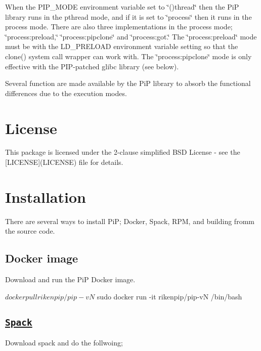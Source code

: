 When the {\ttfamily P\-I\-P\-\_\-\-M\-O\-D\-E} environment variable set to \char`\"{}()thread\char`\"{} then the Pi\-P library runs in the pthread mode, and if it is set to \char`\"{}process\char`\"{} then it runs in the process mode. There are also three implementations in the process mode; \char`\"{}process\-:preload,\char`\"{} \char`\"{}process\-:pipclone\char`\"{} and \char`\"{}process\-:got.\char`\"{} The \char`\"{}process\-:preload\char`\"{} mode must be with the L\-D\-\_\-\-P\-R\-E\-L\-O\-A\-D environment variable setting so that the clone() system call wrapper can work with. The \char`\"{}process\-:pipclone\char`\"{} mode is only effective with the P\-I\-P-\/patched glibc library (see below).

Several function are made available by the Pi\-P library to absorb the functional differences due to the execution modes.

\section*{License}

This package is licensed under the 2-\/clause simplified B\-S\-D License -\/ see the \mbox{[}L\-I\-C\-E\-N\-S\-E\mbox{]}(L\-I\-C\-E\-N\-S\-E) file for details.

\section*{Installation}

There are several ways to install Pi\-P; Docker, Spack, R\-P\-M, and building fromm the source code.

\subsection*{Docker image}

Download and run the Pi\-P Docker image. \begin{DoxyVerb}$ docker pull rikenpip/pip-vN
$ sudo docker run -it rikenpip/pip-vN /bin/bash
\end{DoxyVerb}


\subsection*{\href{https://spack.readthedocs.io/}{\tt Spack}}

Download spack and do the follwoing; 


